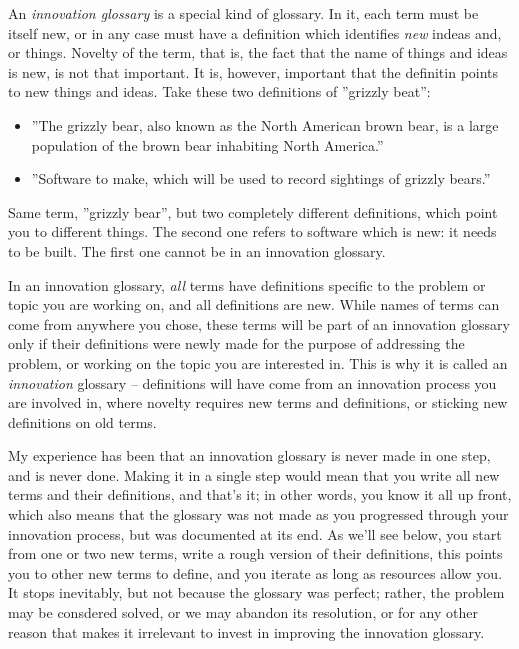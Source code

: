 An \textit{innovation glossary} is a special kind of glossary. In it, each term must be itself new, or in any case must have a definition which identifies \textit{new} indeas and, or things. Novelty of the term, that is, the fact that the name of things and ideas is new, is not that important. It is, however, important that the definitin points to new things and ideas. Take these two definitions of ''grizzly beat'':
\begin{itemize}
    \item ''The grizzly bear, also known as the North American brown bear, is a large population of the brown bear inhabiting North America.'' \cite{wiki-grizzly-bear}
    \item ''Software to make, which will be used to record sightings of grizzly bears.''
\end{itemize}
Same term, ''grizzly bear'', but two completely different definitions, which point you to different things. The second one refers to software which is new: it needs to be built. The first one cannot be in an innovation glossary.

In an innovation glossary, \textit{all} terms have definitions specific to the problem or topic you are working on, and all definitions are new. While names of terms can come from anywhere you chose, these terms will be part of an innovation glossary only if their definitions were newly made for the purpose of addressing the problem, or working on the topic you are interested in. This is why it is called an \textit{innovation} glossary -- definitions will have come from an innovation process you are involved in, where novelty requires new terms and definitions, or sticking new definitions on old terms. 

My experience has been that an innovation glossary is never made in one step, and is never done. Making it in a single step would mean that you write all new terms and their definitions, and that's it; in other words, you know it all up front, which also means that the glossary was not made as you progressed through your innovation process, but was documented at its end. As we'll see below, you start from one or two new terms, write a rough version of their definitions, this points you to other new terms to define, and you iterate as long as resources allow you. It stops inevitably, but not because the glossary was perfect; rather, the problem may be consdered solved, or we may abandon its resolution, or for any other reason that makes it irrelevant to invest in improving the innovation glossary.

